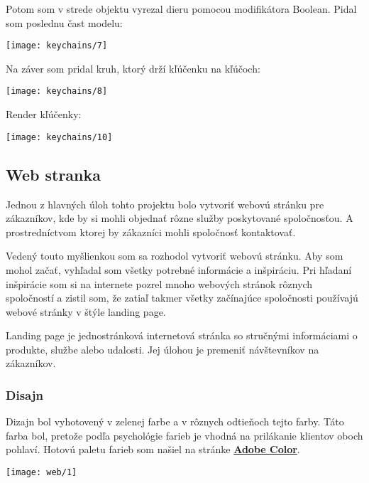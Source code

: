         Potom som v strede objektu vyrezal dieru pomocou modifikátora Boolean. Pidal som poslednu čast modelu: \\
        \begin{center}
          \texttt{[image: keychains/7]}
        \end{center}

        Na záver som pridal kruh, ktorý drží kľúčenku na kľúčoch: \\
        \begin{center}
          \texttt{[image: keychains/8]}
        \end{center}

        Render kľúčenky: \\
        \begin{center}
          \texttt{[image: keychains/10]}
        \end{center}

      \subsection{Web stranka}
      Jednou z hlavných úloh tohto projektu bolo vytvoriť webovú stránku pre zákazníkov, kde by si mohli objednať rôzne služby poskytované spoločnosťou. A prostredníctvom ktorej by zákazníci mohli spoločnosť kontaktovať.

      Vedený touto myšlienkou som sa rozhodol vytvoriť webovú stránku. Aby som mohol začať, vyhľadal som všetky potrebné informácie a inšpiráciu. Pri hľadaní inšpirácie som si na internete pozrel mnoho webových stránok rôznych spoločností a zistil som, že zatiaľ takmer všetky začínajúce spoločnosti používajú webové stránky v štýle landing page.

      Landing page je jednostránková internetová stránka so stručnými informáciami o produkte, službe alebo udalosti. Jej úlohou je premeniť návštevníkov na zákazníkov.
 
      \subsubsection{Disajn}
      Dizajn bol vyhotovený v zelenej farbe a v rôznych odtieňoch tejto farby. Táto farba bol, pretože podľa psychológie farieb je vhodná na prilákanie klientov oboch pohlaví. Hotovú paletu farieb som našiel na stránke \textbf{\href{https://color.adobe.com/ru/}{Adobe Color}}.

      \begin{center}
        \texttt{[image: web/1]}
      \end{center}

